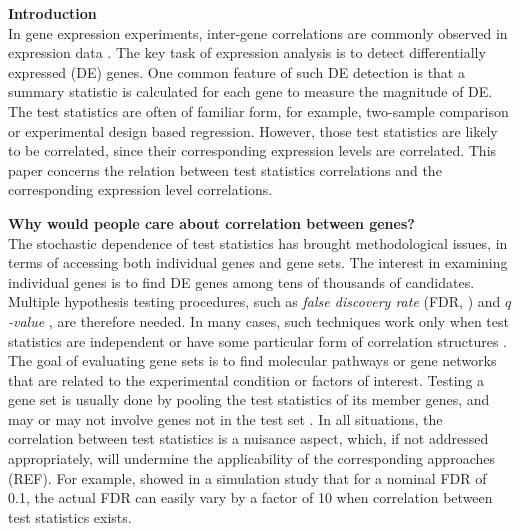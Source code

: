 \documentclass[12pt, a4paper]{article}
\begin{document}
	
	\textbf{Introduction}\\
	In gene expression experiments, inter-gene correlations are commonly observed in expression data \citep{efron2012large, qiu2005effects,barry2008statistical, efron2007correlation,storey2003positive, huang2013gene, wu2012camera, gatti2010heading}. The key task of expression analysis is to detect differentially expressed (DE) genes. One common feature of such DE detection is that a summary statistic is calculated for each gene to measure the magnitude of DE. The test statistics are often of familiar form, for example, two-sample comparison or experimental design based regression. However, those test statistics are likely to be correlated, since their corresponding expression levels are correlated. This paper concerns the relation between test statistics correlations and the corresponding expression level correlations.
	
	\textbf{Why would people care about correlation between genes?}\\
	 The stochastic dependence of test statistics has brought methodological issues, in terms of accessing both individual genes and gene sets. The interest in examining individual genes is to find DE genes among tens of thousands of candidates. Multiple hypothesis testing procedures, such as \textit{false discovery rate} (FDR, \citealt{benjamini1995controlling}) and \textit{$q$-value} \citep{storey2003positive}, are therefore needed. In many cases, such techniques work only when test statistics are independent \citep{benjamini1995controlling} or have some particular form of correlation structures \citep{benjamini2001control}. The goal of evaluating gene sets is to find molecular pathways or gene networks that are related to the experimental condition or factors of interest. Testing a gene set is usually done by pooling the test statistics of its member genes, and may or may not involve genes not in the test set \citep{goeman2007analyzing}. In all situations, the correlation between test statistics is a nuisance aspect, which, if not addressed appropriately, will undermine the applicability of the corresponding approaches (REF). For
	 example, \citet{efron2007correlation} showed in a simulation study that for a nominal FDR of 0.1, the
	 actual FDR can easily vary by a factor of 10 when correlation between test statistics exists. 
	 
\end{document}

